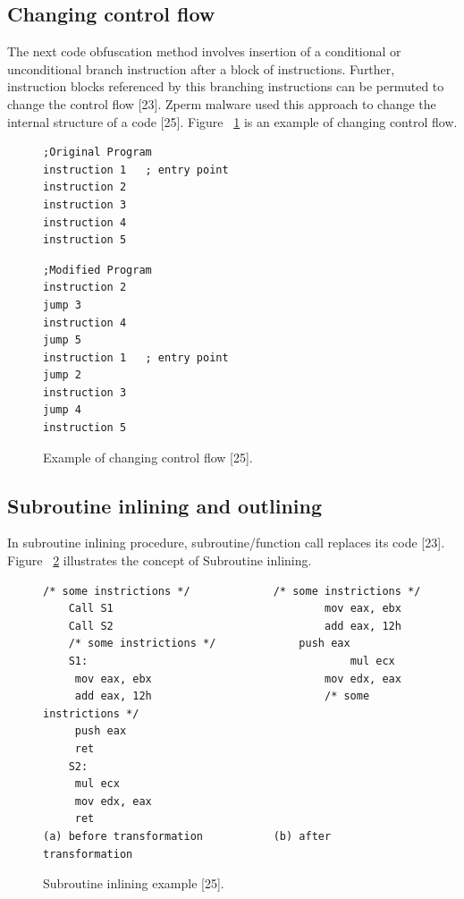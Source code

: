 \subsection{Changing control flow} 
The next code obfuscation method involves insertion of a conditional or unconditional branch instruction after a block of instructions. Further, instruction blocks referenced by this branching instructions can be permuted to change the control flow [23]. Zperm malware used this approach to change the internal structure of a code [25]. Figure ~\ref{fig:changecntflow} is an example of changing control flow.

\begin{figure}
  \centering
  \begin{lstlisting}[language=myasm]
;Original Program 
instruction 1   ; entry point
instruction 2
instruction 3
instruction 4
instruction 5
\end{lstlisting}

\begin{lstlisting}[language=myasm]
;Modified Program
instruction 2
jump 3
instruction 4
jump 5
instruction 1   ; entry point
jump 2
instruction 3
jump 4
instruction 5
\end{lstlisting}

    \caption[Example of changing control flow]{Example of changing control flow [25].}
    \label{fig:changecntflow}
\end{figure}

\subsection{Subroutine inlining and outlining} 
In subroutine inlining procedure, subroutine/function call replaces its code [23]. Figure ~\ref{fig:subroutineinline} illustrates the concept of Subroutine inlining. 

\begin{figure}
  \centering
  \begin{lstlisting}[language=myasm]
	/* some instrictions */				/* some instrictions */ 
	Call S1									mov eax, ebx
	Call S2									add eax, 12h
	/* some instrictions */				push eax
	S1: 										mul ecx
	 mov eax, ebx							mov edx, eax
	 add eax, 12h							/* some instrictions */
	 push eax					
	 ret						
	S2:							
	 mul ecx
	 mov edx, eax
	 ret
(a) before transformation			(b) after transformation
\end{lstlisting}


    \caption[Subroutine inlining example]{Subroutine inlining example [25].}
    \label{fig:subroutineinline}
\end{figure}

